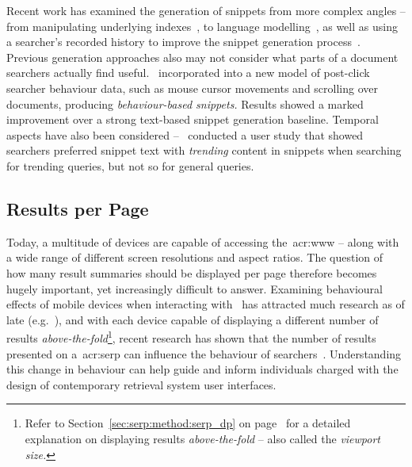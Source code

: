 Recent work has examined the generation of snippets from more complex angles -- from manipulating underlying indexes~\citep{turpin2007fast_snippets, bast2014snippet_generation}, to language modelling~\citep{li2010snippet_extraction, he2012bridging}, as well as using a searcher's recorded history to improve the snippet generation process~\citep{ageev2013summaries, savenkov2011search}. Previous generation approaches also may not consider what parts of a document searchers actually find useful.~\cite{ageev2013summaries} incorporated into a new model of post-click searcher behaviour data, such as mouse cursor movements and scrolling over documents, producing \emph{behaviour-based snippets.} Results showed a marked improvement over a strong text-based snippet generation baseline. Temporal aspects have also been considered --~\cite{svore2012temporal_snippets} conducted a user study that showed searchers preferred snippet text with \emph{trending} content in snippets when searching for trending queries, but not so for general queries.

\subsection{Results per Page}
Today, a multitude of devices are capable of accessing the~\gls{acr:www} -- along with a wide range of different screen resolutions and aspect ratios. The question of how many result summaries should be displayed per page therefore becomes hugely important, yet increasingly difficult to answer. Examining behavioural effects of mobile devices when interacting with~ has attracted much research as of late (e.g.~\cite{kim2012small_vs_large, kim2014eye_tracking, kim2016pagination_versus_scrolling}), and with each device capable of displaying a different number of results \emph{above-the-fold}\footnote{Refer to Section~\ref{sec:serp:method:serp_dp} on page~\pageref{sec:serp:method:serp_dp} for a detailed explanation on displaying results \emph{above-the-fold} -- also called the \emph{viewport size.}}, recent research has shown that the number of results presented on a~\gls{acr:serp} can influence the behaviour of searchers~\citep{joachims2005click_model, kim2014eye_tracking}. Understanding this change in behaviour can help guide and inform individuals charged with the design of contemporary retrieval system user interfaces.


